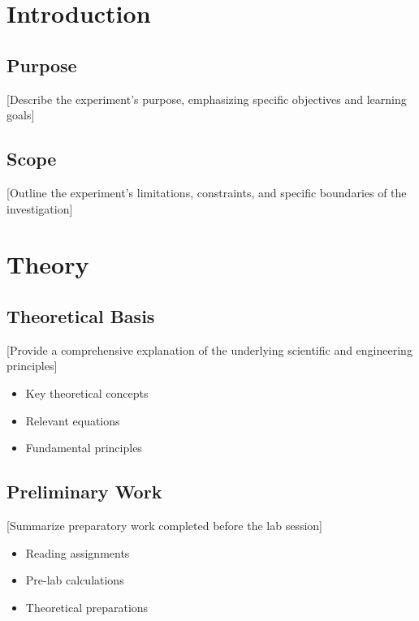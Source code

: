 \documentclass[a4paper]{article}
\begin{document}
\maketitle
\setcounter{page}{2}
\tableofcontents

\section{Introduction}
\subsection{Purpose}
[Describe the experiment's purpose, emphasizing specific objectives and learning goals]

\subsection{Scope}
[Outline the experiment's limitations, constraints, and specific boundaries of the investigation]

\section{Theory}
\subsection{Theoretical Basis}
[Provide a comprehensive explanation of the underlying scientific and engineering principles]
\begin{itemize}
    \item Key theoretical concepts
    \item Relevant equations
    \item Fundamental principles
\end{itemize}

\subsection{Preliminary Work}
[Summarize preparatory work completed before the lab session]
\begin{itemize}
    \item Reading assignments
    \item Pre-lab calculations
    \item Theoretical preparations
\end{itemize}
\end{document}
